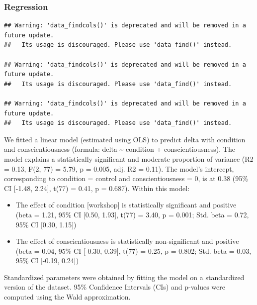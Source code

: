 \documentclass[
  man]{apa6}
\providecommand{\tightlist}{%
  \setlength{\itemsep}{0pt}\setlength{\parskip}{0pt}}
\begin{document}
\hypertarget{regression}{%
\subsubsection{Regression}\label{regression}}

\begin{verbatim}
## Warning: 'data_findcols()' is deprecated and will be removed in a future update.
##   Its usage is discouraged. Please use 'data_find()' instead.

## Warning: 'data_findcols()' is deprecated and will be removed in a future update.
##   Its usage is discouraged. Please use 'data_find()' instead.

## Warning: 'data_findcols()' is deprecated and will be removed in a future update.
##   Its usage is discouraged. Please use 'data_find()' instead.
\end{verbatim}

We fitted a linear model (estimated using OLS) to predict delta with condition and conscientiousness (formula: delta \textasciitilde{} condition + conscientiousness). The model explains a statistically significant and moderate proportion of variance (R2 = 0.13, F(2, 77) = 5.79, p = 0.005, adj. R2 = 0.11). The model's intercept, corresponding to condition = control and conscientiousness = 0, is at 0.38 (95\% CI {[}-1.48, 2.24{]}, t(77) = 0.41, p = 0.687). Within this model:

\begin{itemize}
\tightlist
\item
  The effect of condition {[}workshop{]} is statistically significant and positive (beta = 1.21, 95\% CI {[}0.50, 1.93{]}, t(77) = 3.40, p = 0.001; Std. beta = 0.72, 95\% CI {[}0.30, 1.15{]})
\item
  The effect of conscientiousness is statistically non-significant and positive (beta = 0.04, 95\% CI {[}-0.30, 0.39{]}, t(77) = 0.25, p = 0.802; Std. beta = 0.03, 95\% CI {[}-0.19, 0.24{]})
\end{itemize}

Standardized parameters were obtained by fitting the model on a standardized version of the dataset. 95\% Confidence Intervals (CIs) and p-values were computed using the Wald approximation.
\end{document}

